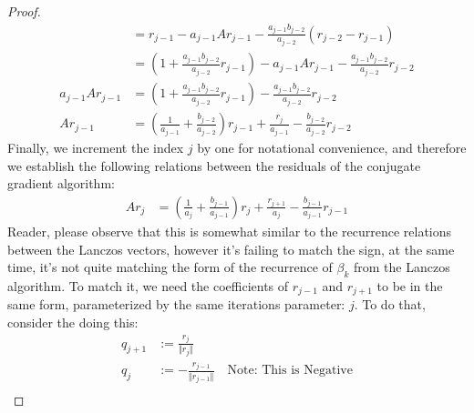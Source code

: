 \documentclass[]{article}
\theoremstyle{definition}
\begin{document}
\begin{appendices}
\begin{proof}
\begin{align}
                    &= 
                    r_{j - 1} - a_{j - 1}Ar_{j - 1} - \frac{a_{j-1}b_{j-2}}{a_{j-2}}\left(
                        r_{j - 2} - r_{j - 1}
                    \right)
                    \\
                    &= \left(
                        1 + \frac{a_{j - 1}b_{j -2}}{a_{j - 2}}r_{j - 1}
                    \right)- a_{j - 1}Ar_{j - 1} - \frac{a_{j-1}b_{j-2}}{a_{j-2}}r_{j - 2}
                    \\
                    a_{j - 1}Ar_{j - 1} &= 
                    \left(
                        1 + \frac{a_{j - 1}b_{j -2}}{a_{j - 2}}r_{j - 1}
                    \right)
                    - \frac{a_{j-1}b_{j-2}}{a_{j-2}}r_{j - 2}
                    \\
                    Ar_{j - 1} &=
                    \left(
                        \frac{1}{a_{j - 1}} + \frac{b_{j - 2}}{a_{j- 2}}
                    \right)r_{j - 1} + 
                    \frac{r_{j}}{a_{j-1}} - 
                    \frac{b_{j - 2}}{a_{j - 2}}r_{j - 2}
                \end{align}
                Finally, we increment the index $j$ by one for notational convenience, and therefore we establish the following relations between the residuals of the conjugate gradient algorithm: 
                \begin{align}
                    Ar_{j} &=
                    \left(
                        \frac{1}{a_{j}} + \frac{b_{j - 1}}{a_{j-  1}}
                    \right)r_{j} + 
                    \frac{r_{j + 1}}{a_{j}} - 
                    \frac{b_{j - 1}}{a_{j - 1}}r_{j - 1}
                \end{align}
                Reader, please observe that this is somewhat similar to the recurrence relations between the Lanczos vectors, however it's failing to match the sign, at the same time, it's not quite matching the form of the recurrence of $\beta_k$ from the Lanczos algorithm. To match it, we need the coefficients of $r_{j - 1}$ and $r_{j + 1}$ to be in the same form, parameterized by the same iterations parameter: $j$. To do that, consider the doing this:  
                \begin{align}
                    q_{j + 1} &:= \frac{r_{j}}{\Vert r_j\Vert}
                    \\
                    q_{j} &:= -\frac{r_{j - 1}}{\Vert r_{j - 1}\Vert} \quad 
                    \text{Note: This is Negative}
                    \\

\end{align}
\end{proof}
\end{appendices}
\end{document}
